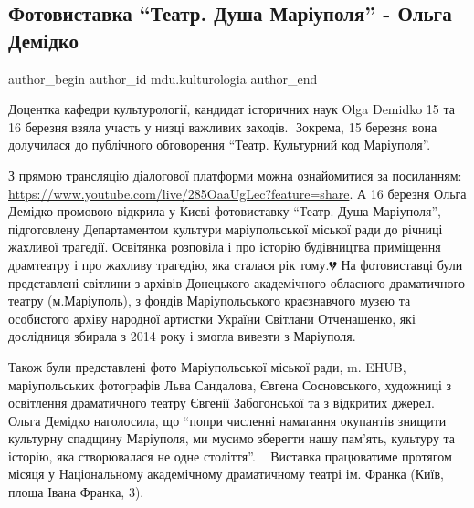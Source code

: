  
 
 
 
 

\subsection{Фотовиставка \enquote{Театр. Душа Маріуполя} - Ольга Демідко}
\label{sec:17_03_2023.fb.mdu.kulturologia.1.fotovystavka_teatr_dusha_mariupolja_olga_demidko}

\ifcmt
 author_begin
   author_id mdu.kulturologia
 author_end
\fi

Доцентка кафедри культурології, кандидат історичних наук Olga Demidko  15 та 16
березня взяла участь у низці важливих заходів.👏 Зокрема, 15 березня вона
долучилася до публічного обговорення \enquote{Театр. Культурний код Маріуполя}. 


З прямою трансляцію діалогової платформи можна ознайомитися за посиланням:
\url{https://www.youtube.com/live/285OaaUgLec?feature=share}. А 16 березня Ольга
Демідко промовою  відкрила у Києві фотовиставку \enquote{Театр. Душа Маріуполя},
підготовлену Департаментом культури маріупольської міської ради до річниці
жахливої трагедії. Освітянка розповіла і про історію будівництва приміщення
драмтеатру і про жахливу трагедію, яка сталася рік тому.💔 На фотовиставці були
представлені світлини з архівів Донецького академічного обласного драматичного
театру (м.Маріуполь), з фондів Маріупольського краєзнавчого музею та особистого
архіву народної артистки України Світлани Отченашенко, які дослідниця збирала з
2014 року і змогла вивезти з Маріуполя.  

Також були представлені фото Маріупольської міської ради, m. EHUB,
маріупольських фотографів Льва Сандалова, Євгена Сосновського, художниці з
освітлення драматичного театру Євгенії Забогонської та з відкритих джерел.
Ольга Демідко наголосила, що \enquote{попри численні намагання окупантів знищити
культурну спадщину Маріуполя, ми мусимо зберегти нашу пам'ять, культуру та
історію, яка створювалася не одне століття}.🙏🇺🇦 Виставка працюватиме
протягом місяця у Національному академічному драматичному театрі ім. Франка
(Київ, площа Івана Франка, 3).


